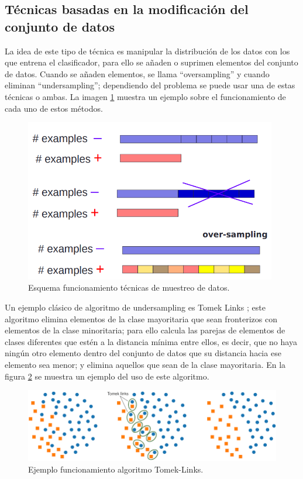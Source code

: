 \subsection{Técnicas basadas en la modificación del conjunto de datos}
La idea de este tipo de técnica es manipular la distribución de los datos con los que entrena el clasificador, para ello se añaden o suprimen elementos del conjunto de datos. Cuando se añaden elementos, se llama “oversampling” y cuando eliminan “undersampling”; dependiendo del problema se puede usar una de estas técnicas o ambas. La imagen \ref{fig:27} muestra un ejemplo sobre el funcionamiento de cada uno de estos métodos.\newline
\newpage
\begin{figure}[H]
	\centering
	\includegraphics[width=110mm]{imagenes/oversampling_undersampling.png}
	\caption{Esquema funcionamiento técnicas de muestreo de datos.}
	\label{fig:27}
\end{figure}
\verticalspace

Un ejemplo clásico de algoritmo de undersampling es Tomek Links \cite{tomek1976two}; este algoritmo elimina elementos de la clase mayoritaria que sean fronterizos con elementos de la clase minoritaria; para ello calcula las parejas de elementos de clases diferentes que estén a la distancia mínima entre ellos, es decir, que no haya ningún otro elemento dentro del conjunto de datos que su distancia hacia ese elemento sea menor; y elimina aquellos que sean de la clase mayoritaria. En la figura \ref{fig:28} se muestra un ejemplo del uso de este algoritmo.\newline


\begin{figure}[H]
	\centering
	\includegraphics[width=120mm]{imagenes/tomek-example.png}
	\caption{Ejemplo funcionamiento algoritmo Tomek-Links.}
	\label{fig:28}
\end{figure}
\verticalspace

